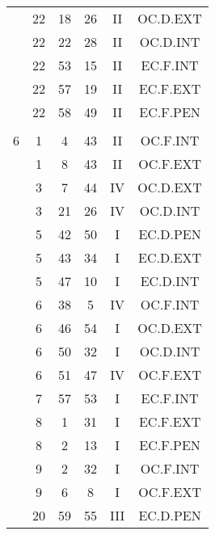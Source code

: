 \documentclass[12pt, a4paper]{article}
\begin{document}
\begin{multicols}{3}
{\begin{tabular}{c c c c c c}
	 	 	 	 & 22 & 18 & 26 & II & OC.D.EXT\\%
	 	 	 	 & 22 & 22 & 28 & II & OC.D.INT\\%
	 	 	 	 & 22 & 53 & 15 & II & EC.F.INT\\%
	 	 	 	 & 22 & 57 & 19 & II & EC.F.EXT\\%
	 	 	 	 & 22 & 58 & 49 & II & EC.F.PEN\\%
	 	 	 	 & & & & & \\%
	 	 	 	6 & 1 & 4 & 43 & II & OC.F.INT\\%
	 	 	 	 & 1 & 8 & 43 & II & OC.F.EXT\\%
	 	 	 	 & 3 & 7 & 44 & IV & OC.D.EXT\\%
	 	 	 	 & 3 & 21 & 26 & IV & OC.D.INT\\%
	 	 	 	 & 5 & 42 & 50 & I & EC.D.PEN\\%
	 	 	 	 & 5 & 43 & 34 & I & EC.D.EXT\\%
	 	 	 	 & 5 & 47 & 10 & I & EC.D.INT\\%
	 	 	 	 & 6 & 38 & 5 & IV & OC.F.INT\\%
	 	 	 	 & 6 & 46 & 54 & I & OC.D.EXT\\%
	 	 	 	 & 6 & 50 & 32 & I & OC.D.INT\\%
	 	 	 	 & 6 & 51 & 47 & IV & OC.F.EXT\\%
	 	 	 	 & 7 & 57 & 53 & I & EC.F.INT\\%
	 	 	 	 & 8 & 1 & 31 & I & EC.F.EXT\\%
	 	 	 	 & 8 & 2 & 13 & I & EC.F.PEN\\%
	 	 	 	 & 9 & 2 & 32 & I & OC.F.INT\\%
	 	 	 	 & 9 & 6 & 8 & I & OC.F.EXT\\%
	 	 	 	 & 20 & 59 & 55 & III & EC.D.PEN\\%

\end{tabular}}
\end{multicols}
\end{document}
